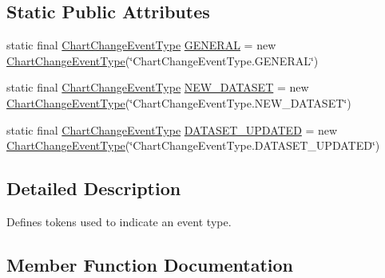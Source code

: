 \subsection*{Static Public Attributes}
\begin{DoxyCompactItemize}
\item 
static final \mbox{\hyperlink{classorg_1_1jfree_1_1chart_1_1event_1_1_chart_change_event_type}{Chart\+Change\+Event\+Type}} \mbox{\hyperlink{classorg_1_1jfree_1_1chart_1_1event_1_1_chart_change_event_type_a957e2116ecec0bcceb310cede866a659}{G\+E\+N\+E\+R\+AL}} = new \mbox{\hyperlink{classorg_1_1jfree_1_1chart_1_1event_1_1_chart_change_event_type}{Chart\+Change\+Event\+Type}}(\char`\"{}Chart\+Change\+Event\+Type.\+G\+E\+N\+E\+R\+AL\char`\"{})
\item 
static final \mbox{\hyperlink{classorg_1_1jfree_1_1chart_1_1event_1_1_chart_change_event_type}{Chart\+Change\+Event\+Type}} \mbox{\hyperlink{classorg_1_1jfree_1_1chart_1_1event_1_1_chart_change_event_type_afe0628066c1b7b983e0fb629ec7c2f77}{N\+E\+W\+\_\+\+D\+A\+T\+A\+S\+ET}} = new \mbox{\hyperlink{classorg_1_1jfree_1_1chart_1_1event_1_1_chart_change_event_type}{Chart\+Change\+Event\+Type}}(\char`\"{}Chart\+Change\+Event\+Type.\+N\+E\+W\+\_\+\+D\+A\+T\+A\+S\+ET\char`\"{})
\item 
static final \mbox{\hyperlink{classorg_1_1jfree_1_1chart_1_1event_1_1_chart_change_event_type}{Chart\+Change\+Event\+Type}} \mbox{\hyperlink{classorg_1_1jfree_1_1chart_1_1event_1_1_chart_change_event_type_a89a1e9dfa6db28bca6a42edef1b3eb52}{D\+A\+T\+A\+S\+E\+T\+\_\+\+U\+P\+D\+A\+T\+ED}} = new \mbox{\hyperlink{classorg_1_1jfree_1_1chart_1_1event_1_1_chart_change_event_type}{Chart\+Change\+Event\+Type}}(\char`\"{}Chart\+Change\+Event\+Type.\+D\+A\+T\+A\+S\+E\+T\+\_\+\+U\+P\+D\+A\+T\+ED\char`\"{})
\end{DoxyCompactItemize}


\subsection{Detailed Description}
Defines tokens used to indicate an event type. 

\subsection{Member Function Documentation}
\mbox{\label{classorg_1_1jfree_1_1chart_1_1event_1_1_chart_change_event_type_a1f65b7ce37a00cc147a07ae934ef379d}} 
